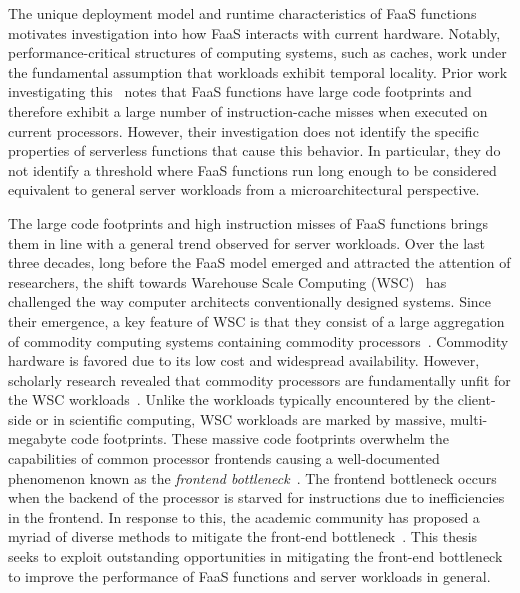 \documentclass[../main.tex]{subfiles}
\begin{document}
\begin{refsection}
The unique deployment model and runtime characteristics of FaaS
functions motivates investigation into how FaaS interacts with current
hardware. Notably, performance-critical structures of computing
systems, such as caches, work under the fundamental assumption that
workloads exhibit temporal locality. Prior work investigating
this~\cite{lukewarm_serverless} notes that FaaS functions have large
code footprints and therefore exhibit a large number of
instruction-cache misses when executed on current processors. However,
their investigation does not identify the specific properties of
serverless functions that cause this behavior. In particular, they do
not identify a threshold where FaaS functions run long enough to be
considered equivalent to general server workloads from a
microarchitectural perspective.

The large code footprints and high instruction misses of FaaS
functions brings them in line with a general trend observed for server
workloads. Over the last three decades, long before the FaaS model
emerged and attracted the attention of researchers, the shift towards
Warehouse Scale Computing (WSC)~\cite{barroso18_datac_as_comput} has
challenged the way computer architects conventionally designed
systems. Since their emergence, a key feature of WSC is that they
consist of a large aggregation of commodity computing systems
containing commodity
processors~\cite{barroso03_web_searc_planet}. Commodity hardware is
favored due to its low cost and widespread availability. However,
scholarly research revealed that commodity processors are
fundamentally unfit for the WSC
workloads~\cite{ferdman12_clear_cloud,kanev15_profil}. Unlike the
workloads typically encountered by the client-side or in scientific
computing, WSC workloads are marked by massive, multi-megabyte code
footprints. These massive code footprints overwhelm the capabilities
of common processor frontends causing a well-documented phenomenon
known as the \emph{frontend
  bottleneck}~\cite{ailamaki99_dbmss_moder_proces,keeton98_perfor_charac_quad_pentium_pro,ranganathan98_perfor_datab_workl_shared_memor}. The
frontend bottleneck occurs when the backend of the processor is
starved for instructions due to inefficiencies in the frontend. In
response to this, the academic community has proposed a myriad of
diverse methods to mitigate the front-end
bottleneck~\cite{reinman99_fetch_direc_instr_prefet,kumar17_boomer,kumar18_blast_throug_front_end_bottl_with_shotg,kumar20_shoot_down_server_front_end_bottl,ferdman08_tempor,ferdman11_proac_instr_fetch,kaynak13_shift,kaynak15_confl,ayers19_asmdb,ajorpaz18_explor_predic_replac_polic_instr,khan20_i_spy,soundararajan21_pdede,ansari20_divid,khan21_rippl,}.
This thesis seeks to exploit outstanding opportunities in mitigating
the front-end bottleneck to improve the performance of FaaS
functions and server workloads in general.




\end{refsection}
\end{document}
